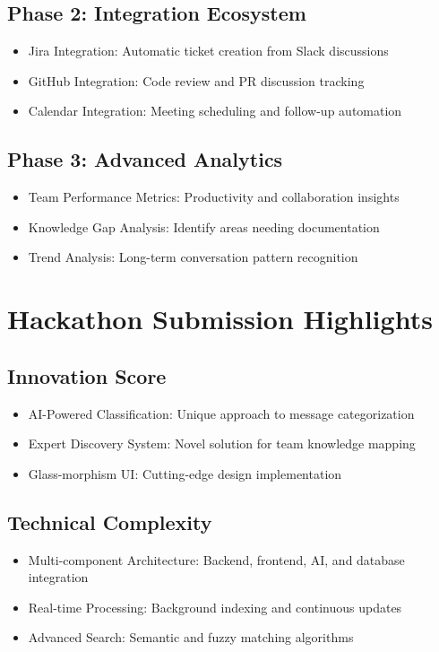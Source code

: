 \documentclass[12pt,a4paper]{article}
\begin{document}
\subsection{Phase 2: Integration Ecosystem}
\begin{itemize}
    \item Jira Integration: Automatic ticket creation from Slack discussions
    \item GitHub Integration: Code review and PR discussion tracking
    \item Calendar Integration: Meeting scheduling and follow-up automation
\end{itemize}
\subsection{Phase 3: Advanced Analytics}
\begin{itemize}
    \item Team Performance Metrics: Productivity and collaboration insights
    \item Knowledge Gap Analysis: Identify areas needing documentation
    \item Trend Analysis: Long-term conversation pattern recognition
\end{itemize}
\section{Hackathon Submission Highlights}
\subsection{Innovation Score}
\begin{itemize}
    \item AI-Powered Classification: Unique approach to message categorization
    \item Expert Discovery System: Novel solution for team knowledge mapping
    \item Glass-morphism UI: Cutting-edge design implementation
\end{itemize}
\subsection{Technical Complexity}
\begin{itemize}
    \item Multi-component Architecture: Backend, frontend, AI, and database integration
    \item Real-time Processing: Background indexing and continuous updates
    \item Advanced Search: Semantic and fuzzy matching algorithms
\end{itemize}
\end{document}
